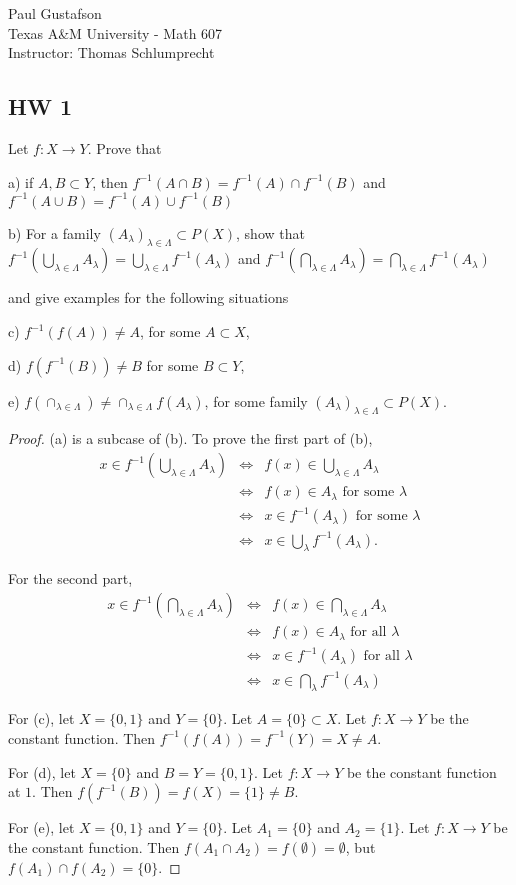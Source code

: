 \documentclass{article}
\begin{document}
\noindent Paul Gustafson\\
\noindent Texas A\&M University - Math 607\\ 
\noindent Instructor: Thomas Schlumprecht

\subsection*{HW 1}
 Let $f: X \to Y$. Prove that 

 a) if $A,B \subset Y$, then $f^{-1}(A \cap B) = f^{-1}(A) \cap f^{-1}(B)$ and
$f^{-1}(A \cup B) = f^{-1}(A) \cup f^{-1}(B)$

b) For a family $(A_\lambda)_{\lambda \in \Lambda} \subset P(X)$,  show that
$f^{-1}(\bigcup_{\lambda \in \Lambda} A_\lambda) = \bigcup_{\lambda \in \Lambda} f^{-1}(A_\lambda)$ and $f^{-1}(\bigcap_{\lambda \in \Lambda} A_\lambda) = \bigcap_{\lambda \in \Lambda} f^{-1}(A_\lambda)$

 and give examples for the following situations

c) $f^{-1}(f(A)) \neq A$, for some $A \subset X$,

d) $f(f^{-1}(B)) \neq B$ for some $B \subset Y$,

e) $f(\cap_{\lambda \in \Lambda}) \neq \cap_{\lambda \in \Lambda} f(A_\lambda)$, for some family $(A_\lambda)_{\lambda \in \Lambda} \subset P(X)$.

\begin{proof}
(a) is a subcase of (b).  To prove the first part of (b), 
\begin{align*}
x \in f^{-1}(\bigcup_{\lambda \in \Lambda} A_\lambda) & \iff & 
f(x) \in \bigcup_{\lambda \in \Lambda} A_\lambda 
\\ & \iff & f(x) \in A_\lambda \text{ for some } \lambda
\\ & \iff & x \in f^{-1}(A_\lambda) \text{ for some } \lambda
\\ & \iff & x \in \bigcup_\lambda f^{-1}(A_\lambda).
\end{align*}

For the second part,
\begin{align*}
x \in f^{-1}(\bigcap_{\lambda \in \Lambda} A_\lambda) & \iff & 
f(x) \in \bigcap_{\lambda \in \Lambda} A_\lambda 
\\ & \iff & f(x) \in A_\lambda \text{ for all } \lambda
\\ & \iff & x \in f^{-1}(A_\lambda) \text { for all } \lambda
\\ & \iff & x \in \bigcap_\lambda f^{-1}(A_\lambda) 
\end{align*}

For (c), let $X = \{0,1\}$ and $Y = \{0\}$.  Let $A = \{0\} \subset X$.  Let $f:X \to Y$ be the constant function.  Then $f^{-1}(f(A)) = f^{-1}(Y) = X \neq A$.

For (d), let $X = \{0\}$ and $B = Y = \{0, 1\}$.   Let $f:X \to Y$ be the constant function at $1$. Then $f(f^{-1}(B)) = f(X) = \{1\} \neq B$.

For (e), let $X = \{0,1\}$ and $Y = \{0\}$. Let $A_1 = \{0\}$ and $A_2 = \{ 1 \}$.  Let $f:X \to Y$ be the constant function.  Then $f(A_1 \cap A_2) = f(\emptyset) = \emptyset$, but $f(A_1) \cap f(A_2) = \{0\}$.
\end{proof}
\end{document}
